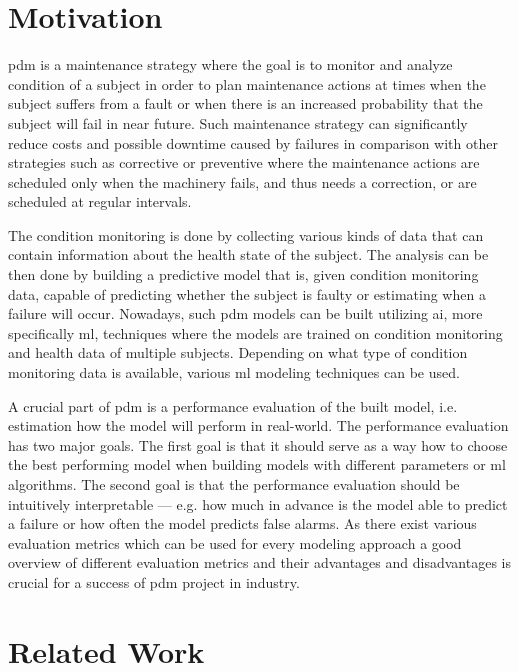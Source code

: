 \begin{introduction}

\section{Motivation}

\Acrfull{pdm} is a maintenance strategy where the goal is to monitor and analyze condition of a subject in order to plan maintenance actions at times when the subject suffers from a fault or when there is an increased probability that the subject will fail in near future.
Such maintenance strategy can significantly reduce costs and possible downtime caused by failures in comparison with other strategies such as corrective or preventive where the maintenance actions are scheduled only when the machinery fails, and thus needs a correction, or are scheduled at regular intervals.

The condition monitoring is done by collecting various kinds of data that can contain information about the health state of the subject.
The analysis can be then done by building a predictive model that is, given condition monitoring data, capable of predicting whether the subject is faulty or estimating when a failure will occur.
Nowadays, such \acrshort{pdm} models can be built utilizing \acrfull{ai}, more specifically \acrfull{ml}, techniques where the models are trained on condition monitoring and health data of multiple subjects.
Depending on what type of condition monitoring data is available, various \acrshort{ml} modeling techniques can be used.

A crucial part of \acrshort{pdm} is a performance evaluation of the built model, i.e. estimation how the model will perform in real-world.
The performance evaluation has two major goals.
The first goal is that it should serve as a way how to choose the best performing model when building models with different parameters or \acrshort{ml} algorithms.
The second goal is that the performance evaluation should be intuitively interpretable --- e.g. how much in advance is the model able to predict a failure or how often the model predicts false alarms.
As there exist various evaluation metrics which can be used for every modeling approach a good overview of different evaluation metrics and their advantages and disadvantages is crucial for a success of \acrshort{pdm} project in industry.

\section{Related Work}


\end{introduction}
